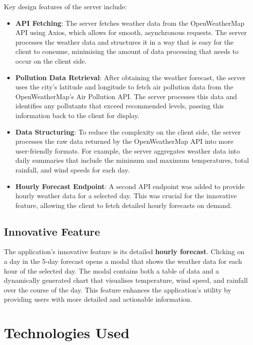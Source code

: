 \documentclass{article}
\begin{document}
Key design features of the server include:

\begin{itemize}
    \item \textbf{API Fetching}: The server fetches weather data from the OpenWeatherMap API using Axios, which allows for smooth, asynchronous requests. The server processes the weather data and structures it in a way that is easy for the client to consume, minimising the amount of data processing that needs to occur on the client side.

    \item \textbf{Pollution Data Retrieval}: After obtaining the weather forecast, the server uses the city’s latitude and longitude to fetch air pollution data from the OpenWeatherMap’s Air Pollution API. The server processes this data and identifies any pollutants that exceed recommended levels, passing this information back to the client for display.

    \item \textbf{Data Structuring}: To reduce the complexity on the client side, the server processes the raw data returned by the OpenWeatherMap API into more user-friendly formats. For example, the server aggregates weather data into daily summaries that include the minimum and maximum temperatures, total rainfall, and wind speeds for each day.

    \item \textbf{Hourly Forecast Endpoint}: A second API endpoint was added to provide hourly weather data for a selected day. This was crucial for the innovative feature, allowing the client to fetch detailed hourly forecasts on demand.
\end{itemize}

\subsection*{Innovative Feature}

The application’s innovative feature is its detailed \textbf{hourly forecast}. Clicking on a day in the 5-day forecast opens a modal that shows the weather data for each hour of the selected day. The modal contains both a table of data and a dynamically generated chart that visualises temperature, wind speed, and rainfall over the course of the day. This feature enhances the application's utility by providing users with more detailed and actionable information.

\section*{Technologies Used}
\end{document}
